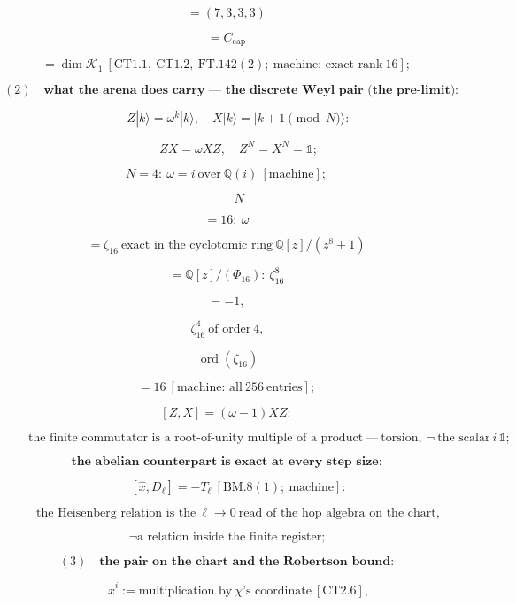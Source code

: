 \documentclass[11pt,openany]{report}
\theoremstyle{canonplain}
\theoremstyle{canondef}
\begin{document}
\[
= (7,3,3,3)
\]

\[
= C_{\mathrm{cap}}
\]

\[
= \dim\mathcal K_1\ [\mathrm{CT1.1},\ \mathrm{CT1.2},\ \mathrm{FT.142}(2);\ \text{machine: exact rank}\ 16];
\]

\[
(2)\quad\textbf{what the arena does carry — the discrete Weyl pair (the pre-limit):}
\]

\[
\qquad Z|k\rangle=\omega^k|k\rangle,\quad X|k\rangle=|k{+}1\!\!\!\pmod N\rangle:
\]

\[
\qquad ZX=\omega XZ,\quad Z^N=X^N=\mathbb1;
\]

\[
N=4:\ \omega=i\ \text{over}\ \mathbb Q(i)\ [\text{machine}];
\]

\[
\qquad N
\]

\[
= 16:\ \omega
\]

\[
= \zeta_{16}\ \text{exact in the cyclotomic ring}\ \mathbb Q[z]/(z^8{+}1)
\]

\[
= \mathbb Q[z]/(\Phi_{16}):\ \zeta_{16}^8
\]

\[
= -1,
\]

\[
\ \zeta_{16}^4\ \text{of order}\ 4,
\]

\[
\ \operatorname{ord}(\zeta_{16})
\]

\[
= 16\ [\text{machine: all}\ 256\ \text{entries}];
\]

\[
[Z,X]=(\omega-1)XZ:
\]

\[
\qquad \text{the finite commutator is a root-of-unity multiple of a product}\ —\ \text{torsion},\ \neg\ \text{the scalar}\ i\,\mathbb1;
\]

\[
\textbf{the abelian counterpart is exact at every step size:}
\]

\[
\qquad [\hat x,D_\ell]=-T_\ell\ [\mathrm{BM.8}(1);\ \text{machine}]:
\]

\[
\qquad \text{the Heisenberg relation is the}\ \ell\to0\ \text{read of the hop algebra on the chart},
\]

\[
\ \neg\text{a relation inside the finite register};
\]

\[
(3)\quad\textbf{the pair on the chart and the Robertson bound:}
\]

\[
\qquad \hat x^i:=\text{multiplication by}\ \chi\text{'s coordinate}\ [\mathrm{CT2.6}],
\]
\end{document}
